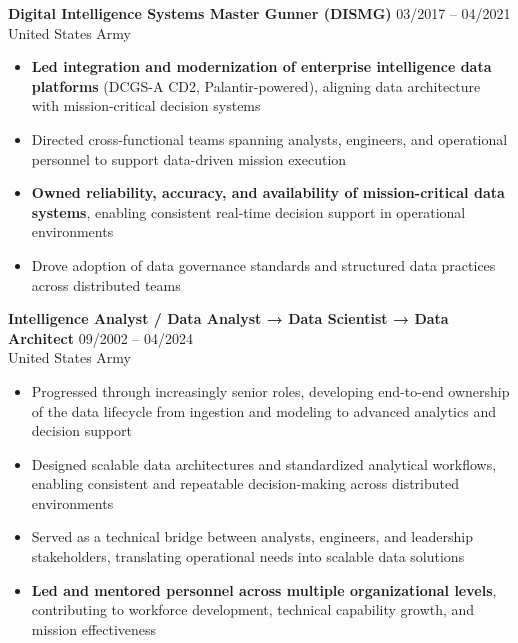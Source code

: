 \textbf{Digital Intelligence Systems Master Gunner (DISMG)} \hfill 03/2017 -- 04/2021 \\
United States Army
\begin{itemize}
    \item \textbf{Led integration and modernization of enterprise intelligence data platforms} (DCGS-A CD2, Palantir-powered), aligning data architecture with mission-critical decision systems
    \item Directed cross-functional teams spanning analysts, engineers, and operational personnel to support data-driven mission execution
    \item \textbf{Owned reliability, accuracy, and availability of mission-critical data systems}, enabling consistent real-time decision support in operational environments
    \item Drove adoption of data governance standards and structured data practices across distributed teams
\end{itemize}

\textbf{Intelligence Analyst / Data Analyst → Data Scientist → Data Architect} \hfill 09/2002 -- 04/2024 \\
United States Army
\begin{itemize}
    \item Progressed through increasingly senior roles, developing end-to-end ownership of the data lifecycle from ingestion and modeling to advanced analytics and decision support
    \item Designed scalable data architectures and standardized analytical workflows, enabling consistent and repeatable decision-making across distributed environments
    \item Served as a technical bridge between analysts, engineers, and leadership stakeholders, translating operational needs into scalable data solutions
    \item \textbf{Led and mentored personnel across multiple organizational levels}, contributing to workforce development, technical capability growth, and mission effectiveness
\end{itemize}
